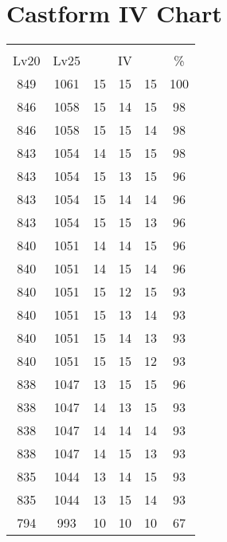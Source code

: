 \documentclass{article}%
\begin{document}
%
\normalsize%
\section{Castform IV Chart}%
\label{sec:Castform IV Chart}%
\renewcommand{\arraystretch}{1.5}%
\begin{tabular}{|c|c|c|c|c|c|}%
\hline%
\multicolumn{6}{|c|}{\textcolor{white}{ 
\linebreak{Castform}
}%
\cellcolor{black}}\\%
\multicolumn{1}{|c}{Lv20}&\multicolumn{1}{c|}{Lv25}&\multicolumn{3}{c|}{IV}&\multicolumn{1}{|c|}{\%}\\%
\hline%
\rowcolor{color100}%
849&1061&15&15&15&100\\%
\hline%
\rowcolor{color98}%
846&1058&15&14&15&98\\%
\hline%
\rowcolor{color98}%
846&1058&15&15&14&98\\%
\hline%
\rowcolor{color98}%
843&1054&14&15&15&98\\%
\hline%
\rowcolor{color96}%
843&1054&15&13&15&96\\%
\hline%
\rowcolor{color96}%
843&1054&15&14&14&96\\%
\hline%
\rowcolor{color96}%
843&1054&15&15&13&96\\%
\hline%
\rowcolor{color96}%
840&1051&14&14&15&96\\%
\hline%
\rowcolor{color96}%
840&1051&14&15&14&96\\%
\hline%
\rowcolor{color93}%
840&1051&15&12&15&93\\%
\hline%
\rowcolor{color93}%
840&1051&15&13&14&93\\%
\hline%
\rowcolor{color93}%
840&1051&15&14&13&93\\%
\hline%
\rowcolor{color93}%
840&1051&15&15&12&93\\%
\hline%
\rowcolor{color96}%
838&1047&13&15&15&96\\%
\hline%
\rowcolor{color93}%
838&1047&14&13&15&93\\%
\hline%
\rowcolor{color93}%
838&1047&14&14&14&93\\%
\hline%
\rowcolor{color93}%
838&1047&14&15&13&93\\%
\hline%
\rowcolor{color93}%
835&1044&13&14&15&93\\%
\hline%
\rowcolor{color93}%
835&1044&13&15&14&93\\%
\hline%
\rowcolor{color91}%
794&993&10&10&10&67\\%
\end{tabular}

%
\end{document}
